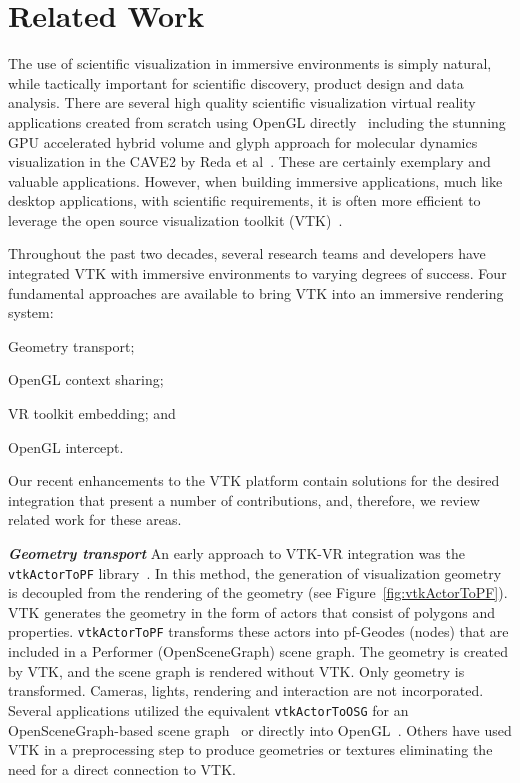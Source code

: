 \section{Related Work}

The use of scientific visualization in immersive environments is simply natural, while tactically important for scientific discovery, product design and data analysis.
There are several high quality scientific visualization virtual reality applications created from scratch using OpenGL directly~\cite{Billen:2008, LaViola:2007, Schulze:2001, Rantzau:1998} including the stunning GPU accelerated hybrid volume and glyph approach for molecular dynamics visualization in the CAVE2 by Reda et al~\cite{Reda:2013}.
These are certainly exemplary and valuable applications.
However, when building immersive applications, much like desktop applications, with scientific requirements, it is often more efficient to leverage the open source visualization toolkit (VTK)~\cite{Schroeder:2004}.

Throughout the past two decades, several research teams and developers have integrated VTK with immersive environments to varying degrees of success.
Four fundamental approaches are available to bring VTK into an
immersive rendering system:

\begin{compactitem}
\item Geometry transport;
\item OpenGL context sharing;
\item VR toolkit embedding; and
\item OpenGL intercept.

\end{compactitem}

Our recent enhancements to the VTK platform contain solutions for the desired integration that present a number of contributions, and, therefore, we review related work for these areas.

\textbf{\textit{Geometry transport}}
An early approach to VTK-VR integration was the \texttt{vtkActorToPF} library~\cite{Leigh98limbo/vtk}.
In this method, the generation of visualization geometry is decoupled from
the rendering of the geometry (see Figure~\ref{fig:vtkActorToPF}). 
VTK generates the geometry in the form of actors that consist of polygons and properties.
\texttt{vtkActorToPF} transforms these actors into pf-Geodes (nodes) that are included in a Performer (OpenSceneGraph) scene graph. The geometry is created by VTK, and the scene graph is rendered without VTK. Only geometry is transformed. Cameras, lights, rendering and interaction are not incorporated. Several applications utilized the equivalent \texttt{vtkActorToOSG} for an OpenSceneGraph-based scene graph~\cite{VE-Suite:2016} or directly into OpenGL~\cite{Ohno:2006}. Others have used VTK in a preprocessing step to produce geometries or textures eliminating the need for a direct connection to VTK\cite{Bivins:2005}.

